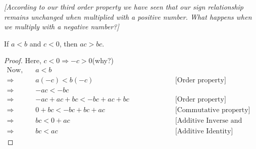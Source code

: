 \documentclass{article}
\newcommand{\Rw}{\Rightarrow}
\newcommand{\hs}{\hspace}
\begin{document}
\textit{[According to our third order property we have seen that our sign relationship remains unchanged when multiplied with a positive number. What happens when we multiply with a negative number?]}
\begin{theorem}{}{}
     If $a<b$ and $c<0$, then $ac>bc$.\\ 
    \begin{proof}
         Here, $c<0 \Rw -c>0$(why?)\\
    \begin{align*}
        \text{Now,}\quad &a<b \hs{7cm}\\
        \Rw\;& a(-c)<b(-c) &\text{[Order property]}\\
        \Rw\;& -ac<-bc\\
        \Rw\;& -ac+ac+bc<-bc+ac+bc  &\text{[Order property]}\\
        \Rw\;& 0+bc<-bc+bc+ac       &\text{[Commutative property]}\\
        \Rw\;& bc<0+ac             &\text{[Additive Inverse and identity]}\\
        \Rw\;& bc<ac                &\text{[Additive Identity]}
    \end{align*}
    \end{proof}
\end{theorem}
\end{document}
